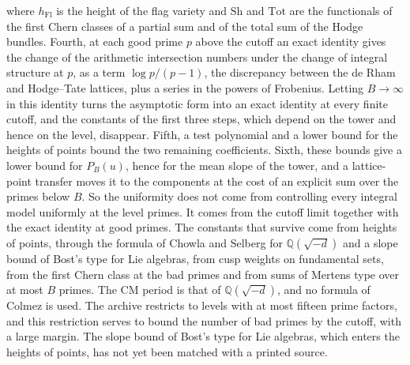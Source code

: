 \documentclass[11pt,letterpaper]{article}
\numberwithin{equation}{section}
\begin{document}
where $h_{\mathrm{Fl}}$ is the height of the flag variety and $\mathrm{Sh}$ and $\mathrm{Tot}$ are the functionals of the first Chern classes of a partial sum and of the total sum of the Hodge bundles. Fourth, at each good prime $p$ above the cutoff an exact identity gives the change of the arithmetic intersection numbers under the change of integral structure at $p$, as a term $\log p/(p-1)$, the discrepancy between the de Rham and Hodge--Tate lattices, plus a series in the powers of Frobenius. Letting $B\to\infty$ in this identity turns the asymptotic form into an exact identity at every finite cutoff, and the constants of the first three steps, which depend on the tower and hence on the level, disappear. Fifth, a test polynomial and a lower bound for the heights of points bound the two remaining coefficients. Sixth, these bounds give a lower bound for $P_B(u)$, hence for the mean slope of the tower, and a lattice-point transfer moves it to the components at the cost of an explicit sum over the primes below $B$. So the uniformity does not come from controlling every integral model uniformly at the level primes. It comes from the cutoff limit together with the exact identity at good primes. The constants that survive come from heights of points, through the formula of Chowla and Selberg for $\mathbb Q(\sqrt{-d})$ and a slope bound of Bost's type for Lie algebras, from cusp weights on fundamental sets, from the first Chern class at the bad primes and from sums of Mertens type over at most $B$ primes. The CM period is that of $\mathbb Q(\sqrt{-d})$, and no formula of Colmez is used. The archive restricts to levels with at most fifteen prime factors, and this restriction serves to bound the number of bad primes by the cutoff, with a large margin. The slope bound of Bost's type for Lie algebras, which enters the heights of points, has not yet been matched with a printed source.
\end{document}
